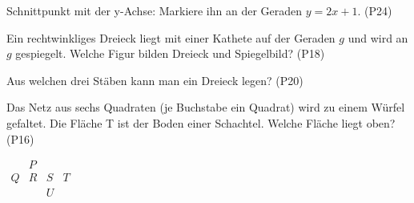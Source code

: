 \documentclass[11pt]{article}
\begin{document}
\begin{aufgabe}{\begin{minipage}[t]{0.6\linewidth}Schnittpunkt mit der y-Achse: Markiere ihn an der Geraden $y = 2x + 1$. \hfill (P24)\end{minipage}\hfill\begin{minipage}[t]{0.37\linewidth}\vspace{0pt}
\begin{ksys}[xmin=-5,xmax=5,ymin=-5,ymax=5,klein]  \end{ksys}
\end{minipage}}
\end{aufgabe}

\begin{aufgabe}{Ein rechtwinkliges Dreieck liegt mit einer Kathete auf der Geraden $g$ und wird an $g$ gespiegelt. Welche Figur bilden Dreieck und Spiegelbild? \hfill (P18)}
\end{aufgabe}

\begin{aufgabe}{Aus welchen drei Stäben kann man ein Dreieck legen? \hfill (P20) \\   }
\end{aufgabe}

\begin{aufgabe}{\begin{minipage}[t]{0.6\linewidth}Das Netz aus sechs Quadraten (je Buchstabe ein Quadrat) wird zu einem Würfel gefaltet. Die Fläche T ist der Boden einer Schachtel. Welche Fläche liegt oben? \hfill (P16) \\ \leerfeld\end{minipage}\hfill\begin{minipage}[t]{0.37\linewidth}\vspace{0pt}
$\begin{array}{cccc}  & P &  &  \\ Q & R & S & T \\  &  & U &  \end{array}$
\end{minipage}}
\end{aufgabe}

\begleitteil
{}
\end{document}
